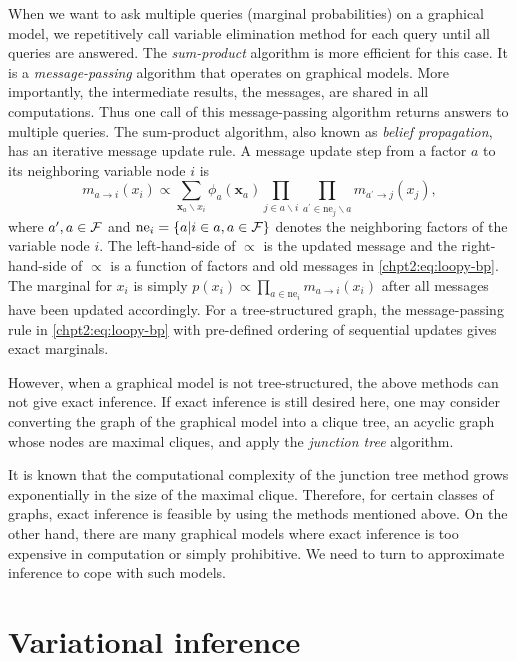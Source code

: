 When we want to ask multiple queries (marginal probabilities) on a graphical model, we repetitively call variable elimination method for each query until all queries are answered. The \textit{sum-product} algorithm is more efficient for this case. It is a \textit{message-passing} algorithm that operates on graphical models. More importantly, the intermediate results, the messages, are shared in all computations. Thus one call of this message-passing algorithm returns answers to multiple queries. The sum-product algorithm, also known as \textit{belief propagation}, has an iterative message update rule. A message update step from a factor $a$ to its neighboring variable node $i$ is 
\begin{equation}\label{chpt2:eq:loopy-bp}
  m_{a\rightarrow i}(x_i) \propto \sum_{\bm{x}_{a} \backslash x_i}
  \phi_{a}(\bm{x}_{a}) \prod_{j \in a \backslash i} \prod_{a^{\prime} \in \mathrm{ne}_j
    \backslash a} m_{a^{\prime}\rightarrow j}(x_j),
\end{equation}
where $a^\prime, a \in \mathcal{F}$ and $\mathrm{ne}_i = \left\{ a | i \in a, a \in \mathcal{F} \right\}$ denotes the neighboring factors of the variable node $i$. The left-hand-side of $\propto$ is the updated message and the right-hand-side of $\propto$ is a function of factors and old messages in \eqref{chpt2:eq:loopy-bp}. The marginal for $x_i$ is simply $p(x_i)\propto\prod_{a\in\mathrm{ne}_i}m_{a\rightarrow i}(x_i)$ after all messages have been updated accordingly. For a tree-structured graph, the message-passing rule in \eqref{chpt2:eq:loopy-bp} with pre-defined ordering of sequential updates gives exact marginals.

However, when a graphical model is not tree-structured, the above methods can not give exact inference. If exact inference is still desired here, one may consider converting the graph of the graphical model into a clique tree, an acyclic graph whose nodes are maximal cliques, and apply the \textit{junction tree} algorithm.

It is known that the computational complexity of the junction tree method grows exponentially in the size of the maximal clique. Therefore, for certain classes of graphs, exact inference is feasible by using the methods mentioned above. On the other hand, there are many graphical models where exact inference is too expensive in computation or simply prohibitive. We need to turn to approximate inference to cope with such models.


\section{Variational inference}
\label{chpt2:sec:variational-inference}

